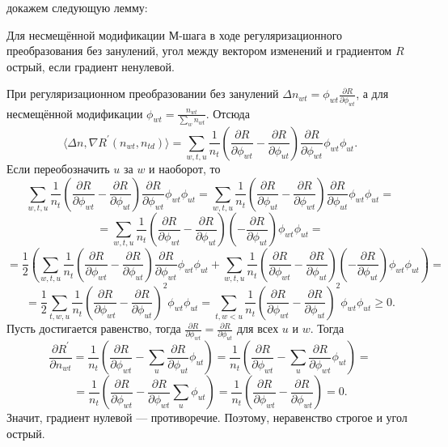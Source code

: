 \documentclass[12pt, twoside]{article}
\begin{document}
 докажем следующую лемму:
\begin{Lemma}           
Для несмещённой модификации М-шага в ходе регуляризационного преобразования  без занулений, угол  между вектором изменений и градиентом $R$ острый, если градиент ненулевой.
\end{Lemma}
\begin{Proof}
При регуляризационном преобразовании без занулений $\Delta n_{wt} =  \phi_{wt} \frac{\partial{R}}{\partial{\phi_{wt}}}$, а для несмещённой модификации $\phi_{wt} = \frac{n_{wt}}{\sum\limits_w n_{wt}}$. Отсюда
\[
\langle \Delta n, \nabla R^{\prime}(n_{wt}, n_{td})\rangle = \sum\limits_{w, t, u}  \frac{1}{n_{t}}  \left(  \frac{\partial{R}}{\partial{\phi_{wt}}}  -  \frac{\partial{R}}{\partial{\phi_{ut}}}  \right)  \frac{\partial{R}}{\partial{\phi_{wt}}} \phi_{wt} \phi_{ut}.
\]
Если переобозначить $u$ за $w$ и наоборот, то 
\[
\sum\limits_{w, t, u}  \frac{1}{n_{t}}  \left(  \frac{\partial{R}}{\partial{\phi_{wt}}}  -  \frac{\partial{R}}{\partial{\phi_{ut}}}  \right)  \frac{\partial{R}}{\partial{\phi_{wt}}} \phi_{wt} \phi_{ut}  = \sum\limits_{w, t, u}  \frac{1}{n_{t}}  \left(  \frac{\partial{R}}{\partial{\phi_{ut}}}  -  \frac{\partial{R}}{\partial{\phi_{wt}}}  \right)  \frac{\partial{R}}{\partial{\phi_{ut}}} \phi_{wt} \phi_{ut} = 
\]
\[
= \sum\limits_{w, t, u}  \frac{1}{n_{t}}  \left(  \frac{\partial{R}}{\partial{\phi_{wt}}}  -  \frac{\partial{R}}{\partial{\phi_{ut}}}  \right)  \left(-\frac{\partial{R}}{\partial{\phi_{ut}}}\right) \phi_{wt} \phi_{ut} = 
\]
\[
= \frac12 \left(\sum\limits_{w, t, u}  \frac{1}{n_{t}}  \left(  \frac{\partial{R}}{\partial{\phi_{wt}}}  -  \frac{\partial{R}}{\partial{\phi_{ut}}}  \right)  \frac{\partial{R}}{\partial{\phi_{wt}}} \phi_{wt} \phi_{ut} +  \sum\limits_{w, t, u}  \frac{1}{n_{t}}  \left(  \frac{\partial{R}}{\partial{\phi_{wt}}}  -  \frac{\partial{R}}{\partial{\phi_{ut}}}  \right)  \left(-\frac{\partial{R}}{\partial{\phi_{ut}}}\right) \phi_{wt} \phi_{ut} \right)= 
\]
\[
= \frac12 \sum\limits_{t, w, u}  \frac{1}{n_{t}} \left(  \frac{\partial{R}}{\partial{\phi_{wt}}}  -  \frac{\partial{R}}{\partial{\phi_{ut}}}  \right)^2 \phi_{wt} \phi_{ut} = \sum\limits_{t, w < u}  \frac{1}{n_{t}} \left(  \frac{\partial{R}}{\partial{\phi_{wt}}}  -  \frac{\partial{R}}{\partial{\phi_{ut}}}  \right)^2 \phi_{wt} \phi_{ut} \geq 0.
\]
Пусть достигается равенство, тогда $\frac{\partial{R}}{\partial{\phi_{wt}}}  =  \frac{\partial{R}}{\partial{\phi_{ut}}}$ для всех $u$ и $w$. Тогда
\[
\frac{\partial{R^{\prime}}}{\partial{n_{wt}}} = \frac{1}{n_t} \left( \frac{\partial{R}}{\partial{\phi_{wt}}} - \sum_{u}  \frac{\partial{R}}{\partial{\phi_{ut}}} \phi_{ut} \right) = \frac{1}{n_t} \left( \frac{\partial{R}}{\partial{\phi_{wt}}} - \sum_{u}  \frac{\partial{R}}{\partial{\phi_{wt}}} \phi_{ut} \right) =
\]
\[
=\frac{1}{n_t} \left( \frac{\partial{R}}{\partial{\phi_{wt}}} - \frac{\partial{R}}{\partial{\phi_{wt}}} \sum_{u} \phi_{ut} \right)  = \frac{1}{n_t} \left( \frac{\partial{R}}{\partial{\phi_{wt}}} - \frac{\partial{R}}{\partial{\phi_{wt}}} \right) = 0.
\]
Значит, градиент нулевой --- противоречие. Поэтому, неравенство строгое и угол острый.
\end{Proof}
\medskip
\end{document}
